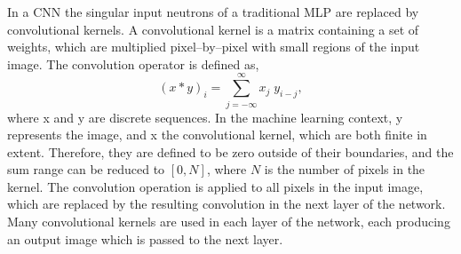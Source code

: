 In a CNN the singular input neutrons of a traditional MLP are replaced by
convolutional kernels. A convolutional kernel is a matrix containing a set of 
weights, which are multiplied pixel--by--pixel with small regions of the input 
image. The convolution operator is defined as, 
\begin{equation}
	\left( x * y \right)_i = \sum_{j = - \infty}^{\infty} x_j \; y_{i-j},
\end{equation}
where x and y are discrete sequences. In the machine learning context, y
represents the image, and x the convolutional kernel, which are both finite in
extent. Therefore, they are defined to be zero outside of their boundaries, and
the sum range can be reduced to $\left[0, N\right]$, where $N$ is the number 
of pixels in the kernel. The convolution operation is applied to all pixels in 
the input image, which are replaced by the resulting convolution in the next 
layer of the network. Many convolutional kernels are used in each layer of the 
network, each producing an output image which is passed to the next 
layer. 

